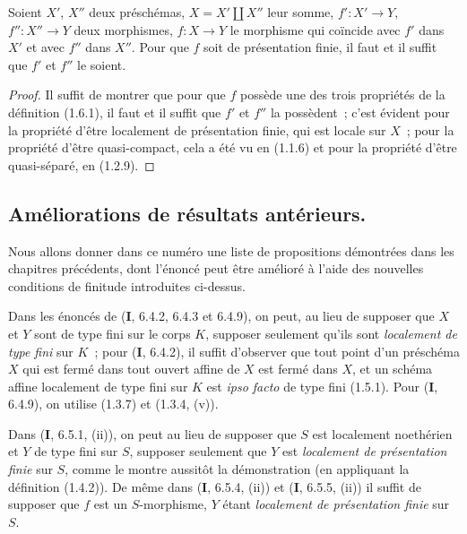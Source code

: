 \begin{proposition}[1.6.5]
\label{IV.1.6.5-fr}
Soient $X'$, $X''$ deux préschémas, $X=X'\amalg X''$ leur somme,
$f':X'\to Y$, $f'':X''\to Y$ deux morphismes, $f:X\to Y$ le morphisme qui
coïncide avec $f'$ dans $X'$ et avec $f''$ dans $X''$. Pour que $f$ soit de
présentation finie, il faut et il suffit que $f'$ et $f''$ le soient.
\end{proposition}

\par\medskip\noindent
\begin{proof}
Il suffit de montrer que pour que $f$ possède une des trois propriétés de la
définition
(1.6.1), il faut et il suffit que $f'$ et $f''$ la possèdent~; c'est évident
pour la propriété d'être localement de présentation finie, qui est locale sur
$X$~; pour la propriété d'être quasi-compact, cela a été vu en (1.1.6) et pour
la propriété d'être quasi-séparé, en (1.2.9).
\end{proof}

\subsection{Améliorations de résultats antérieurs.}
\label{subsection:IV.1.7-fr}

Nous allons donner dans ce numéro une liste de propositions démontrées dans
les chapitres précédents, dont l'énoncé peut être amélioré à l'aide des
nouvelles conditions de finitude introduites ci-dessus.

\begin{env}[1.7.1]
\label{IV.1.7.1-fr}
Dans les énoncés de (\textbf{I}, 6.4.2, 6.4.3 et 6.4.9), on peut, au lieu de supposer
que $X$ et $Y$ sont de type fini sur le corps $K$, supposer seulement qu'ils
sont \emph{localement de type fini} sur $K$~; pour (\textbf{I}, 6.4.2), il suffit
d'observer que tout point d'un préschéma $X$ qui est fermé dans tout ouvert
affine de $X$ est fermé dans $X$, et un schéma affine localement de type fini
sur $K$ est \emph{ipso facto} de type fini (1.5.1). Pour (\textbf{I}, 6.4.9), on utilise
(1.3.7) et (1.3.4, (v)).
\end{env}

\begin{env}[1.7.2]
\label{IV.1.7.2-fr}
Dans (\textbf{I}, 6.5.1, (ii)), on peut au lieu de supposer que $S$ est localement
noethérien et $Y$ de type fini sur $S$, supposer seulement que $Y$ est
\emph{localement de présentation finie} sur $S$, comme le montre aussitôt la
démonstration (en appliquant la définition (1.4.2)). De même dans (\textbf{I}, 6.5.4,
(ii)) et (\textbf{I}, 6.5.5, (ii)) il suffit de supposer que $f$ est un $S$-morphisme,
$Y$ étant \emph{localement de présentation finie} sur $S$.
\end{env}

